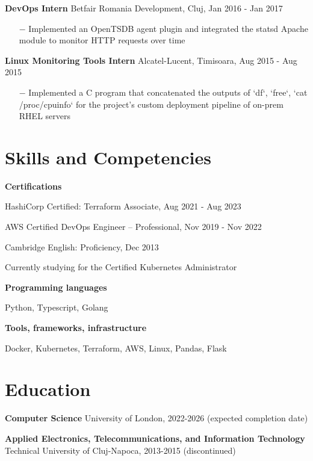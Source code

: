 \documentclass{article}
\begin{document}
\textbf{DevOps Intern} \hfill Betfair Romania Development, Cluj, Jan 2016 - Jan 2017

\begin{itemize}
    \item[$-$] Implemented an OpenTSDB agent plugin and integrated the statsd Apache module to monitor HTTP requests over time
\end{itemize}

\textbf{Linux Monitoring Tools Intern} \hfill Alcatel-Lucent, Timisoara, Aug 2015 - Aug 2015

\begin{itemize}
    \item[$-$] Implemented a C program that concatenated the outputs of `df`, `free`, `cat /proc/cpuinfo` for the project's custom deployment pipeline of on-prem RHEL servers
\end{itemize}


\section*{Skills and Competencies}
\indent

\textbf{Certifications}

\hspace{1em}HashiCorp Certified: Terraform Associate, Aug 2021 - Aug 2023

\hspace{1em}AWS Certified DevOps Engineer – Professional, Nov 2019 - Nov 2022

\hspace{1em}Cambridge English: Proficiency, Dec 2013

\hspace{1em}Currently studying for the Certified Kubernetes Administrator

\textbf{Programming languages}

\hspace{1em}Python, Typescript, Golang

\textbf{Tools, frameworks, infrastructure}

\hspace{1em}Docker, Kubernetes, Terraform, AWS, Linux, Pandas, Flask

\section*{Education}
\indent

\textbf{Computer Science} \hfill University of London, 2022-2026 (expected completion date)

\textbf{Applied Electronics, Telecommunications, and Information Technology} \hfill Technical University of Cluj-Napoca, 2013-2015 (discontinued)
\end{document}
